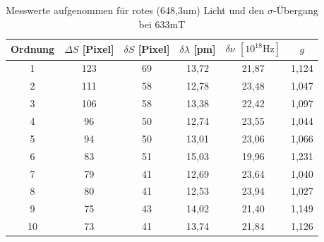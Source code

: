 \begin{table}[htbp]
    \begin{tabular}{|c|c|c|c|c|c|}
        Ordnung & $\Delta S$ [Pixel]    & $\delta S$ [Pixel]    &$\delta \lambda$ [pm]  & $\delta \nu$ $[10^{18}\text{Hz}]$ &   $g$\\\hline
        1&  123&    69& 13,72&  21,87&  1,124\\\hline
        2&  111&    58& 12,78&  23,48&  1,047\\\hline
        3&  106&    58& 13,38&  22,42&  1,097\\\hline
        4&  96&     50& 12,74&  23,55&  1,044\\\hline
        5&  94&     50& 13,01&  23,06&  1,066\\\hline
        6&  83&     51& 15,03&  19,96&  1,231\\\hline
        7&  79&     41& 12,69&  23,64&  1,040\\\hline
        8&  80&     41& 12,53&  23,94&  1,027\\\hline
        9&  75&     43& 14,02&  21,40&  1,149\\\hline
        10& 73&     41& 13,74&  21,84&  1,126\\\hline
    \end{tabular}
    \caption{Messwerte aufgenommen für rotes (648,3nm) Licht und den $\sigma$-Übergang bei 633mT}
    \label{tab_red_sigma}
\end{table}

